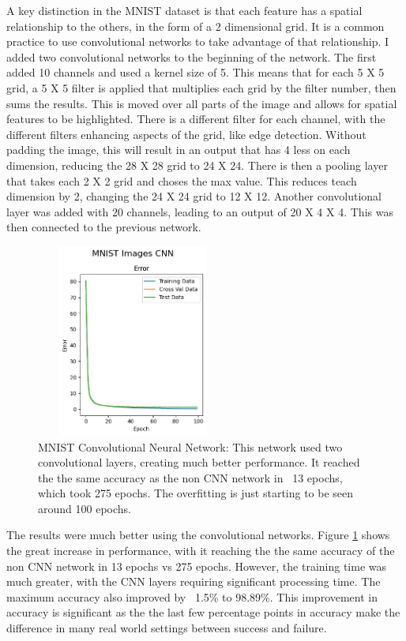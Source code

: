 \documentclass[letterpaper]{article} %
\begin{document}
A key distinction in the MNIST dataset is that each feature has a spatial relationship to the others, in the form of a 2 dimensional grid.  It is a common practice to use convolutional networks to take advantage of that relationship.  I added two convolutional networks to the beginning of the network.  The first added 10 channels and used a kernel size of 5.  This means that for each 5 X 5 grid, a 5 X 5 filter is applied that multiplies each grid by the filter number, then sums the results.  This is moved over all parts of the image and allows for spatial features to be highlighted.  There is a different filter for each channel, with the different filters enhancing aspects of the grid, like edge detection.  Without padding the image, this will result in an output that has 4 less on each dimension, reducing the 28 X 28 grid to 24 X 24.   There is then a pooling layer that takes each 2 X 2 grid and choses the max value.  This reduces teach dimension by 2, changing the 24 X 24 grid to 12 X 12.  Another convolutional layer was added with 20 channels, leading to an output of 20 X 4 X 4.  This was then connected to the previous network.

\begin{figure}[htb]
\centering
\includegraphics[width=2.5in, height=2.5in]{figures/MNIST_Images_CNN_Error_MNIST.png}
\caption{MNIST Convolutional Neural Network:  This network used two convolutional layers, creating much better performance.  It reached the the same accuracy as the non CNN network in ~13 epochs, which took 275 epochs.  The overfitting is just starting to be seen around 100 epochs. }
\label{fig:MNIST_Error_MNIST_cnn}
\end{figure}

The results were much better using the convolutional networks.  Figure \ref{fig:MNIST_Error_MNIST_cnn} shows the great increase in performance, with it reaching the the same accuracy of the non CNN network in 13 epochs vs 275 epochs.  However, the training time was much greater, with the CNN layers requiring significant processing time. The maximum accuracy also improved by ~1.5\% to 98.89\%.  This improvement in accuracy is significant as the the last few percentage points in accuracy make the difference in many real world settings between success and failure. 
\end{document}
